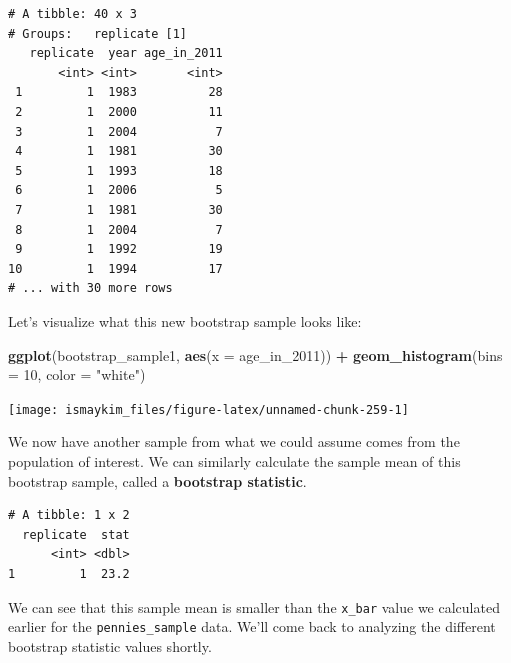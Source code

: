 \documentclass[12pt, krantz2,]{krantz}
\makeatletter
\newenvironment{Shaded}{\begin{snugshade}}{\end{snugshade}}
\newcommand{\DataTypeTok}[1]{\textcolor[rgb]{0.27,0.27,0.27}{#1}}
\newcommand{\DecValTok}[1]{\textcolor[rgb]{0.06,0.06,0.06}{#1}}
\newcommand{\KeywordTok}[1]{\textcolor[rgb]{0.27,0.27,0.27}{\textbf{#1}}}
\newcommand{\NormalTok}[1]{#1}
\newcommand{\OperatorTok}[1]{\textcolor[rgb]{0.43,0.43,0.43}{\textbf{#1}}}
\newcommand{\StringTok}[1]{\textcolor[rgb]{0.5,0.5,0.5}{#1}}
\newenvironment{kframe}{%
\medskip{}
\setlength{\fboxsep}{.8em}
 \def\at@end@of@kframe{}%
 \ifinner\ifhmode%
  \def\at@end@of@kframe{\end{minipage}}%
  \begin{minipage}{\columnwidth}%
 \fi\fi%
 \def\FrameCommand##1{\hskip\@totalleftmargin \hskip-\fboxsep
 \colorbox{shadecolor}{##1}\hskip-\fboxsep
     \hskip-\linewidth \hskip-\@totalleftmargin \hskip\columnwidth}%
 \MakeFramed {\advance\hsize-\width
   \@totalleftmargin\z@ \linewidth\hsize
   \@setminipage}}%
 {\par\unskip\endMakeFramed%
 \at@end@of@kframe}
\renewenvironment{Shaded}{\begin{kframe}}{\end{kframe}}
\makeatother
\begin{document}
\begin{verbatim}
# A tibble: 40 x 3
# Groups:   replicate [1]
   replicate  year age_in_2011
       <int> <int>       <int>
 1         1  1983          28
 2         1  2000          11
 3         1  2004           7
 4         1  1981          30
 5         1  1993          18
 6         1  2006           5
 7         1  1981          30
 8         1  2004           7
 9         1  1992          19
10         1  1994          17
# ... with 30 more rows
\end{verbatim}

Let's visualize what this new bootstrap sample looks like:

\begin{Shaded}
\begin{Highlighting}[]
\KeywordTok{ggplot}\NormalTok{(bootstrap_sample1, }\KeywordTok{aes}\NormalTok{(}\DataTypeTok{x =}\NormalTok{ age_in_}\DecValTok{2011}\NormalTok{)) }\OperatorTok{+}
\StringTok{  }\KeywordTok{geom_histogram}\NormalTok{(}\DataTypeTok{bins =} \DecValTok{10}\NormalTok{, }\DataTypeTok{color =} \StringTok{"white"}\NormalTok{)}
\end{Highlighting}
\end{Shaded}

\begin{center}\texttt{[image: ismaykim\_files/figure-latex/unnamed-chunk-259-1]} \end{center}

We now have another sample from what we could assume comes from the population of interest. We can similarly calculate the sample mean of this bootstrap sample, called a \textbf{bootstrap statistic}.

\begin{Shaded}
\end{Shaded}

\begin{verbatim}
# A tibble: 1 x 2
  replicate  stat
      <int> <dbl>
1         1  23.2
\end{verbatim}

We can see that this sample mean is smaller than the \texttt{x\_bar} value we calculated earlier for the \texttt{pennies\_sample} data. We'll come back to analyzing the different bootstrap statistic values shortly.
\end{document}
